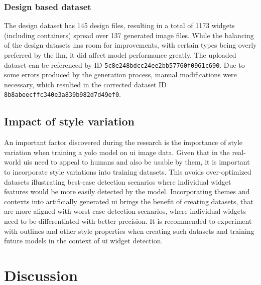 \documentclass[Bachelor, BIC, english, fhCitStyle, IEEE]{BASE/twbook} %
\def\code#1{\texttt{#1}}
\begin{document}
\subsection{Design based dataset}
The design dataset has 145 design files, resulting in a total of 1173 widgets (including containers) spread over 137 generated image files. While the balancing of the design datasets has room for improvements, with certain types being overly preferred by the \ac{llm}, it did affect model performance greatly. The uploaded dataset can be referenced by ID \code{5c8e248bdcc24ee2bb57760f0961c690}. Due to some errors produced by the generation process, manual modifications were necessary, which resulted in the corrected dataset ID \code{8b8abeecffc340e3a839b982d7d49ef0}.
\section{Impact of style variation}
An important factor discovered during the research is the importance of style variation when training a \ac{yolo} model on \ac{ui} image data. Given that in the real-world \acp{ui} need to appeal to humans and also be usable by them, it is important to incorporate style variations into training datasets. This avoids over-optimized datasets illustrating best-case detection scenarios where individual widget features would be more easily detected by the model. Incorporating themes and contexts into artificially generated \ac{ui} brings the benefit of creating datasets, that are more aligned with worst-case detection scenarios, where individual widgets need to be differentiated with better precision. It is recommended to experiment with outlines and other style properties when creating such datasets and training future models in the context of \ac{ui} widget detection.
\clearpage
\chapter{Discussion}
\clearpage %

\printbibliography
\clearpage

\listoffigures %
\clearpage
\end{document}
